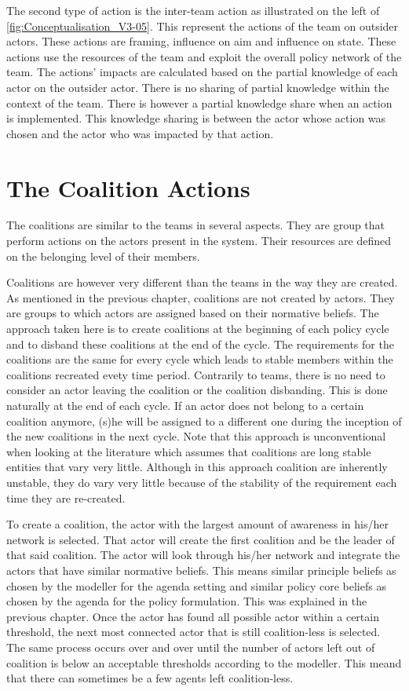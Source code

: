 The second type of action is the inter-team action as illustrated on the left of \autoref{fig:Conceptualisation_V3-05}. This represent the actions of the team on outsider actors. These actions are framing, influence on aim and influence on state. These actions use the resources of the team and exploit the overall policy network of the team. The actions' impacts are calculated based on the partial knowledge of each actor on the outsider actor. There is no sharing of partial knowledge within the context of the team. There is however a partial knowledge share when an action is implemented. This knowledge sharing is between the actor whose action was chosen and the actor who was impacted by that action.


%
\section{The Coalition Actions}
\label{sec:coalitionActions}

The coalitions are similar to the teams in several aspects. They are group that perform actions on the actors present in the system. Their resources are defined on the belonging level of their members. 

Coalitions are however very different than the teams in the way they are created. As mentioned in the previous chapter, coalitions are not created by actors. They are groups to which actors are assigned based on their normative beliefs. The approach taken here is to create coalitions at the beginning of each policy cycle and to disband these coalitions at the end of the cycle. The requirements for the coalitions are the same for every cycle which leads to stable members within the coalitions recreated evety time period. Contrarily to teams, there is no need to consider an actor leaving the coalition or the coalition disbanding. This is done naturally at the end of each cycle. If an actor does not belong to a certain coalition anymore, (s)he will be assigned to a different one during the inception of the new coalitions in the next cycle. Note that this approach is unconventional when looking at the literature which assumes that coalitions are long stable entities that vary very little. Although in this approach coalition are inherently unstable, they do vary very little because of the stability of the requirement each time they are re-created.

To create a coalition, the actor with the largest amount of awareness in his/her network is selected. That actor will create the first coalition and be the leader of that said coalition. The actor will look through his/her network and integrate the actors that have similar normative beliefs. This means similar principle beliefs as chosen by the modeller for the agenda setting and similar policy core beliefs as chosen by the agenda for the policy formulation. This was explained in the previous chapter. Once the actor has found all possible actor within a certain threshold, the next most connected actor that is still coalition-less is selected. The same process occurs over and over until the number of actors left out of coalition is below an acceptable thresholds according to the modeller. This meand that there can sometimes be a few agents left coalition-less.

